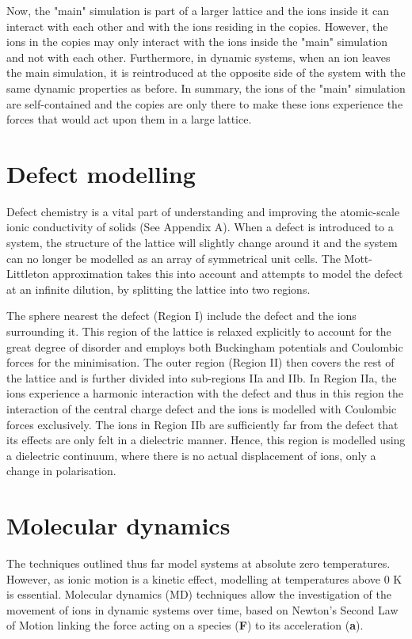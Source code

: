 \documentclass[12pt]{report}
\begin{document}
Now, the "main" simulation is part of a larger lattice and the ions inside it can interact with each other and with the ions residing in the copies.
However, the ions in the copies may only interact with the ions inside the "main" simulation and not with each other.
Furthermore, in dynamic systems, when an ion leaves the main simulation, it is reintroduced at the opposite side of the system with the same dynamic properties as before.
In summary, the ions of the "main" simulation are self-contained and the copies are only there to make these ions experience the forces that would act upon them in a large lattice.

\section{Defect modelling}

Defect chemistry is a vital part of understanding and improving the atomic-scale ionic conductivity of solids (See Appendix A).
When a defect is introduced to a system, the structure of the lattice will slightly change around it and the system can no longer be modelled as an array of symmetrical unit cells.
The Mott-Littleton approximation takes this into account and attempts to model the defect at an infinite dilution, by splitting the lattice into two regions.  

The sphere nearest the defect (Region I) include the defect and the ions surrounding it. 
This region of the lattice is relaxed explicitly to account for the great degree of disorder and employs both Buckingham potentials and Coulombic forces for the minimisation. 
The outer region (Region II) then covers the rest of the lattice and is further divided into sub-regions IIa and IIb. 
In Region IIa, the ions experience a harmonic interaction with the defect and thus in this region the interaction of the central charge defect and the ions is modelled with Coulombic forces exclusively. 
The ions in Region IIb are sufficiently far from the defect that its effects are only felt in a dielectric manner.
Hence, this region is modelled using a dielectric continuum, where there is no actual displacement of ions, only a change in polarisation.\cite{mott1938}

\section{Molecular dynamics}

The techniques outlined thus far model systems at absolute zero temperatures.
However, as ionic motion is a kinetic effect, modelling at temperatures above 0 K is essential.
Molecular dynamics (MD) techniques allow the investigation of the movement of ions in dynamic systems over time, based on Newton's Second Law of Motion linking the force acting on a species (\textbf{F}) to its acceleration (\textbf{a}).\cite{frenkel2001}
\end{document}
